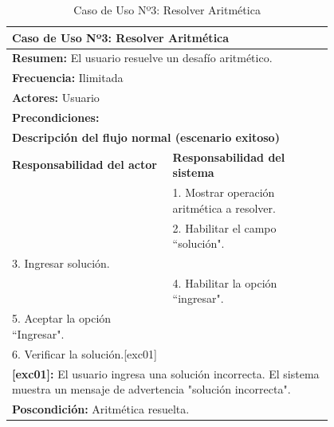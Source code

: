 \begin{table}[H]
    \centering
    \caption{Caso de Uso Nº3: Resolver Aritmética}
    \begin{tabular}{| p{0.4\linewidth} | p{0.4\linewidth} |}
        \hline
        \multicolumn{2}{|l|}{\textbf{Caso de Uso Nº3:}  Resolver Aritmética} \\
        \hline
        \multicolumn{2}{|l|}{\textbf{Resumen:}  El usuario resuelve un desafío aritmético.} \\
        \hline
        \multicolumn{2}{|l|}{\textbf{Frecuencia:}  Ilimitada} \\
        \hline
        \multicolumn{2}{|l|}{\textbf{Actores:}  Usuario} \\
        \hline
        \multicolumn{2}{|l|}{\textbf{Precondiciones:}} \\
        \hline
        \multicolumn{2}{|l|}{\textbf{Descripción del flujo normal (escenario exitoso)} } \\
        \hline
        \textbf{Responsabilidad del actor} & \textbf{Responsabilidad del sistema}\\
            & 1. Mostrar operación aritmética a resolver.\\
            & 2. Habilitar el campo ``solución".\\
        3. Ingresar solución. &\\
            & 4. Habilitar la opción ``ingresar".\\
        5. Aceptar la opción ``Ingresar". &\\
        6. Verificar la solución.[exc01]&\\
        \hline
        \multicolumn{2}{|p{0.8\linewidth}|}{\textbf{[exc01]:} El usuario ingresa una solución incorrecta. El sistema muestra un mensaje de advertencia "solución incorrecta".} \\
        \hline
        \multicolumn{2}{|l|}{\textbf{Poscondición:}  Aritmética resuelta.} \\
        \hline
    \end{tabular}
    \label{table:3}
\end{table}

